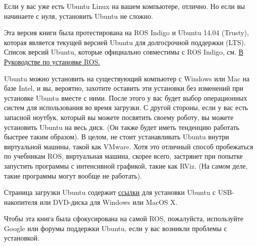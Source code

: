 

Если у вас уже есть Ubuntu Linux на вашем компьютере, отлично. Но если вы начинаете с нуля, установить Ubuntu не сложно.

Эта версия книги была протестирована на ROS Indigo и Ubuntu 14.04 (Trusty), которая является текущей версией Ubuntu для долгосрочной поддержки (LTS). Список версий Ubuntu, которые официально совместимы с ROS Indigo, см. \href{http://wiki.ros.org/indigo/Installation/Ubuntu}{В Руководстве по установке ROS.}

Ubuntu можно установить на существующий компьютер с Windows или Mac на базе Intel, и вы, вероятно, захотите оставить эти установки без изменений при установке Ubuntu вместе с ними. После этого у вас будет выбор операционных систем для использования во время загрузки. С другой стороны, если у вас есть запасной ноутбук, который вы можете посвятить своему роботу, вы можете установить Ubuntu на весь диск. (Он также будет иметь тенденцию работать быстрее таким образом). В целом, не стоит устанавливать Ubuntu внутри виртуальной машины, такой как VMware. Хотя это отличный способ пробежаться по учебникам ROS, виртуальная машина, скорее всего, застрянет при попытке запустить программы с интенсивной графикой, такие как RViz. (На самом деле, такие программы могут вообще не работать).

Страница загрузки Ubuntu содержит \href{http://www.ubuntu.com/download/desktop}{ссылки} для установки Ubuntu с USB-накопителя или DVD-диска для Windows или MacOS X.

Чтобы эта книга была сфокусирована на самой ROS, пожалуйста, используйте Google или форумы поддержки Ubuntu, если у вас возникли проблемы с установкой.


